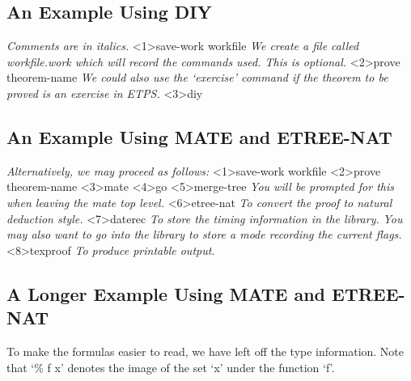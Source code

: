 \subsection{An Example Using DIY}

\begin{tpsexample}
{\it Comments are in italics.}
<1>save-work workfile
{\it We create a file called workfile.work which will record the commands used.
This is optional.}
<2>prove theorem-name
{\it We could also use the `exercise' command if the theorem to be proved is
an exercise in ETPS.}
<3>diy
\end{tpsexample}

\subsection{An Example Using MATE and ETREE-NAT}


\begin{tpsexample}
{\it Alternatively, we may proceed as follows:}
<1>save-work workfile
<2>prove theorem-name
<3>mate
<4>go
<5>merge-tree
{\it You will be prompted for this when leaving the mate top level.}
<6>etree-nat
{\it To convert the proof to natural deduction style.}
<7>daterec
{\it To store the timing information in the library.}
{\it You may also want to go into the library to store a mode recording the
current flags.}
<8>texproof
{\it To produce printable output.}
\end{tpsexample}


\subsection{A  Longer Example Using MATE and ETREE-NAT}
\label{MATE-then-ETREE-NAT}

To make the formulas easier to read, we have left off the type information.
Note that `\% f x' denotes the image of the set `x' under the function `f'.

